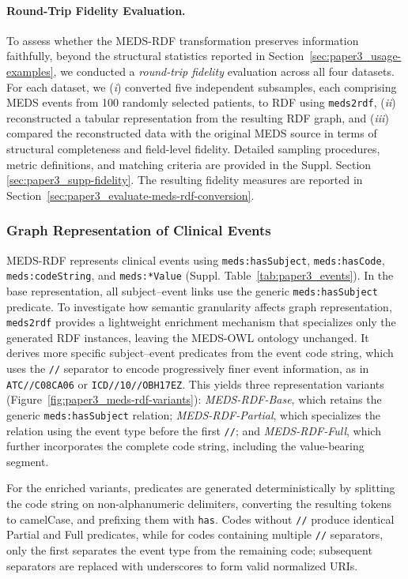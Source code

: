 \paragraph{Round-Trip Fidelity Evaluation.}\label{sec:paper3_fidelity}
To assess whether the MEDS-RDF transformation preserves information faithfully, beyond the structural statistics reported in Section~\ref{sec:paper3_usage-examples}, we conducted a \emph{round-trip fidelity} evaluation across all four datasets. For each dataset, we (\textit{i}) converted five independent subsamples, each comprising MEDS events from 100 randomly selected patients, to RDF using \texttt{meds2rdf}, (\textit{ii}) reconstructed a tabular representation from the resulting RDF graph, and (\textit{iii}) compared the reconstructed data with the original MEDS source in terms of structural completeness and field-level fidelity. Detailed sampling procedures, metric definitions, and matching criteria are provided in the Suppl. Section \ref{sec:paper3_supp-fidelity}. The resulting fidelity measures are reported in Section~\ref{sec:paper3_evaluate-meds-rdf-conversion}.

\subsubsection{Graph Representation of Clinical Events}\label{sec:paper3_enrichment}
MEDS-RDF represents clinical events using \texttt{meds:hasSubject}, \texttt{meds:hasCode}, \texttt{meds:codeString}, and \texttt{meds:*Value} (Suppl. Table~\ref{tab:paper3_events}). In the base representation, all subject--event links use the generic \texttt{meds:hasSubject} predicate. To investigate how semantic granularity affects graph representation, \texttt{meds2rdf} provides a lightweight enrichment mechanism that specializes only the generated RDF instances, leaving the MEDS-OWL ontology unchanged. It derives more specific subject--event predicates from the event code string, which uses the \texttt{//} separator to encode progressively finer event information, as in \texttt{ATC//C08CA06} or \texttt{ICD//10//OBH17EZ}. This yields three representation variants (Figure~\ref{fig:paper3_meds-rdf-variants}): \emph{MEDS-RDF-Base}, which retains the generic \texttt{meds:hasSubject} relation; \emph{MEDS-RDF-Partial}, which specializes the relation using the event type before the first \texttt{//}; and \emph{MEDS-RDF-Full}, which further incorporates the complete code string, including the value-bearing segment.

For the enriched variants, predicates are generated deterministically by splitting the code string on non-alphanumeric delimiters, converting the resulting tokens to camelCase, and prefixing them with \texttt{has}. Codes without \texttt{//} produce identical Partial and Full predicates, while for codes containing multiple \texttt{//} separators, only the first separates the event type from the remaining code; subsequent separators are replaced with underscores to form valid normalized URIs.

